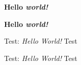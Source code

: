 \documentclass[a4paper, 12pt]{article}
\begin{document}
{\huge \textbf{Hello \textit{world!}}}

{\small {\bf Hello {\it world!}}}

Test: \textit{Hello World!} Test

Test: {\it Hello World!} Test
\end{document}
